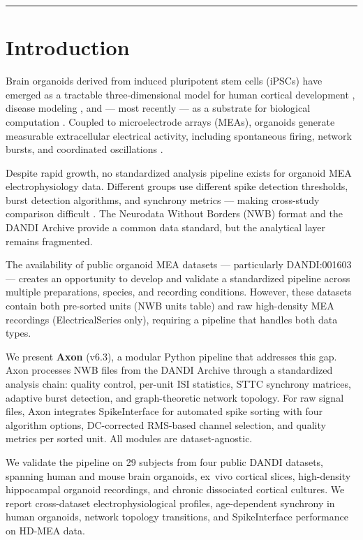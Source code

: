 \documentclass[11pt,a4paper]{article}
\begin{document}
\noindent\rule{\textwidth}{0.8pt}
\vspace{4pt}

\section{Introduction}

Brain organoids derived from induced pluripotent stem cells (iPSCs) have emerged 
as a tractable three-dimensional model for human cortical development 
\citep{lancaster2013}, disease modeling \citep{trujillo2022review}, and --- most 
recently --- as a substrate for biological computation \citep{kagan2022}. Coupled 
to microelectrode arrays (MEAs), organoids generate measurable extracellular 
electrical activity, including spontaneous firing, network bursts, and coordinated 
oscillations \citep{trujillo2019}.

Despite rapid growth, no standardized analysis pipeline exists for organoid MEA 
electrophysiology data. Different groups use different spike detection thresholds, 
burst detection algorithms, and synchrony metrics --- making cross-study comparison 
difficult \citep{smirnova2023}. The Neurodata Without Borders (NWB) format 
\citep{rubel2022} and the DANDI Archive \citep{bhatt2023} provide a common data 
standard, but the analytical layer remains fragmented.

The availability of public organoid MEA datasets --- particularly DANDI:001603 
\citep{vandermolen2026} --- creates an opportunity to develop and validate a 
standardized pipeline across multiple preparations, species, and recording 
conditions. However, these datasets contain both pre-sorted units (NWB units table) 
and raw high-density MEA recordings (ElectricalSeries only), requiring a pipeline 
that handles both data types.

We present \textbf{Axon} (v6.3), a modular Python pipeline that addresses this gap. 
Axon processes NWB files from the DANDI Archive through a standardized analysis 
chain: quality control, per-unit ISI statistics, STTC synchrony matrices, adaptive 
burst detection, and graph-theoretic network topology. For raw signal files, Axon 
integrates SpikeInterface \citep{buccino2020} for automated spike sorting with four 
algorithm options, DC-corrected RMS-based channel selection, and quality metrics per 
sorted unit. All modules are dataset-agnostic.

We validate the pipeline on 29 subjects from four public DANDI datasets, spanning 
human and mouse brain organoids, ex~vivo cortical slices, high-density hippocampal 
organoid recordings, and chronic dissociated cortical cultures. We report 
cross-dataset electrophysiological profiles, age-dependent synchrony in human 
organoids, network topology transitions, and SpikeInterface performance on HD-MEA 
data.
\end{document}
